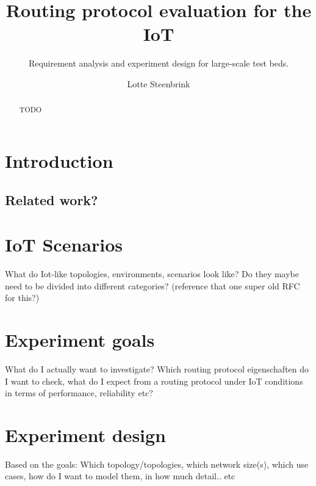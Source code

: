 \documentclass{acm_proc_article-sp}
\begin{document}
\title{Routing protocol evaluation for the IoT}
\subtitle{Requirement analysis and experiment design for large-scale test beds.}

\author{
\alignauthor
Lotte Steenbrink
}

\maketitle
\begin{abstract}
TODO
\end{abstract}


\section{Introduction}
\label{sec:Intro}


\subsection{Related work?}
\label{subsec:realted_work}


\section{IoT Scenarios}
\label{sec:Scenarios}
What do Iot-like topologies, environments, scenarios look like? Do they maybe need to be divided into different categories? (reference that one super old RFC for this?)

\section{Experiment goals}
\label{sec:Goals}
What do I actually want to investigate? Which routing protocol eigenschaften do I want to check, what do I expect from a routing protocol under IoT conditions in terms of performance, reliability etc?

\section{Experiment design}
\label{sec:Goals}
Based on the goals: Which topology/topologies, which network size(s), which use cases, how do I want to model them, in how much detail.. etc
\end{document}
